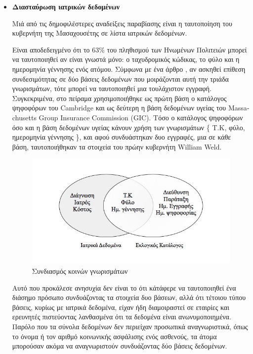 \begin{itemize}
\item \textbf{Διασταύρωση ιατρικών δεδομένων }

Μιά από τις δημοφιλέστερες αναδείξεις παραβίασης είναι η ταυτοποίηση του κυβερνήτη της Μασαχουσέτης σε λίστα ιατρικών δεδομένων. 

Είναι αποδεδειγμένο ότι το 63\% του πληθισμού των Ηνωμένων Πολιτειών μπορεί να ταυτοποιηθεί αν είναι γνωστά μόνο: ο ταχυδρομικός κώδικας, το φύλο και η ημερομηνία γέννησης ενός ατόμου. Σύμφωνα με ένα άρθρο \textlatin{\cite{Sweeney:2001:CDC:935675} }, αν ασκηθεί επίθεση συνδεσιμότητας σε δύο βάσεις δεδομένων που μοιράζονται αυτή την τριάδα γνωρισμάτων, τότε μπορεί να ταυτοποιηθεί μια τουλάχιστον εγγραφή. Συγκεκριμένα, στο πείραμα χρησιμοποιήθηκε ως πρώτη βάση ο κατάλογος ψηφοφόρων του \textlatin{Cambridge} και ως δεύτερη η βάση δεδομένων υγείας του \textlatin{ Massachusetts Group Insurance Commission (GIC)}. Τόσο ο κατάλογος ψηφοφόρων όσο και η βάση δεδομένων υγείας κάνουν χρήση των γνωρισμάτων \{ T.K, φύλο, ημερομηνία γέννησης \}, και αφού συνδυάστηκαν δυο εγγραφές, μια σε κάθε βάση, ταυτοποιήθηκαν τα στοιχεία του πρώην κυβερνήτη \textlatin{William Weld}. 

\begin{figure} [h!]
\begin{center}
  \includegraphics[scale=0.55]{images/TK.jpg}
  \caption{Συνδιασμός κοινών γνωρισμάτων}
  \end{center}
\end{figure}

Αυτό που προκάλεσε ανησυχία δεν είναι το ότι κάτάφερε να ταυτοποιηθεί ένα διάσημο πρόσωπο συνδυάζοντας τα στοιχεία δυο βάσεων, αλλά ότι τέτοιου τύπου βάσεις, κυρίως με ιατρικά δεδομένα, είχαν ήδη διαμοιραστεί σε εταιρίες και ερευνητές πιστεύοντας λανθασμένα ότι τα δεδομένα είναι ανωνυμοποιημένα. 
Παρόλο που τα σύνολα δεδομένων δεν περιείχαν προσωπικά αναγνωριστικά, όπως το όνομα ή τον αριθμό κοινωνικής ασφάλισης ενός ασθενούς, τα άτομα μπορούσαν ακόμα να αναγνωριστούν συνδυάζοντας δύο βάσεις δεδομένων. 
\clearpage





\end{itemize}
